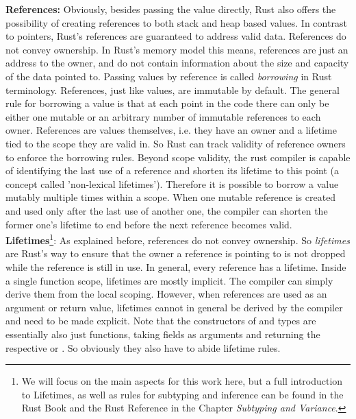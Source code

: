 \textbf{References:} Obviously, besides passing the value directly, Rust also offers the possibility of creating references to both stack and heap based values. In contrast to pointers, Rust's references are guaranteed to address valid data. References do not convey ownership. In Rust's memory model this means, references are just an address to the owner, and do not contain information about the size and capacity of the data pointed to. Passing values by reference is called \emph{borrowing} in Rust terminology. References, just like values, are immutable by default. The general rule for borrowing a value is that at each point in the code there can only be either one mutable or an arbitrary number of immutable references to each owner. References are values themselves, i.e. they have an owner and a lifetime tied to the scope they are valid in. So Rust can track validity of reference owners to enforce the borrowing rules. Beyond scope validity, the rust compiler is capable of identifying the last use of a reference and shorten its lifetime to this point (a concept called 'non-lexical lifetimes'). Therefore it is possible to borrow a value mutably multiple times within a scope. When one mutable reference is created and used only after the last use of another one, the compiler can shorten the former one's lifetime to end before the next reference becomes valid. \\

\textbf{Lifetimes}\footnote{We will focus on the main aspects for this work here, but a full introduction to Lifetimes, as well as rules for subtyping and inference can be found in the Rust Book\cite{rustbook} and the Rust Reference\cite{rustreference} in the Chapter \emph{Subtyping and Variance}.}: As explained before, references do not convey ownership. So \emph{lifetimes} are Rust's way to ensure that the owner a reference is pointing to is not dropped while the reference is still in use. 
In general, every reference has a lifetime. Inside a single function scope, lifetimes are mostly implicit. The compiler can simply derive them from the local scoping. However, when references are used as an argument or return value, lifetimes cannot in general be derived by the compiler and need to be made explicit. Note that the constructors of  and  types are essentially also just functions, taking fields as arguments and returning the respective  or . So obviously they also have to abide lifetime rules. \\

